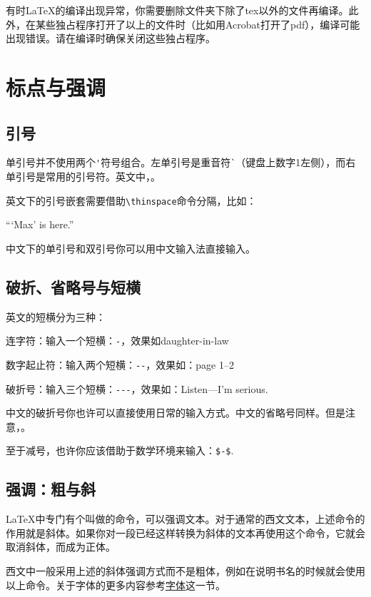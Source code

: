 {有时\LaTeX 的编译出现异常，你需要删除文件夹下除了tex以外的文件再编译。此外，在某些独占程序打开了以上的文件时（比如用Acrobat打开了pdf），编译可能出现错误。请在编译时确保关闭这些独占程序。

\section{标点与强调}
\subsection{引号}
单引号并不使用两个\verb|'|符号组合。左单引号是重音符\verb|`|（键盘上数字1左侧），而右单引号是常用的引号符。英文中，。

英文下的引号嵌套需要借助\verb|\thinspace|命令分隔，比如：

\begin{codeshow}
``\thinspace`Max' is here.''
\end{codeshow}

中文下的单引号和双引号你可以用中文输入法直接输入。

\subsection{破折、省略号与短横}
英文的短横分为三种：
\begin{feai}
\item 连字符：输入一个短横：\verb|-|，效果如daughter-in-law
\item 数字起止符：输入两个短横：\verb|--|，效果如：page 1--2
\item 破折号：输入三个短横：\verb|---|，效果如：Listen---I'm serious.
\end{feai}

中文的破折号你也许可以直接使用日常的输入方式。中文的省略号同样。但是注意，。

至于减号，也许你应该借助于数学环境来输入：\verb|$-$|. 

\subsection{强调：粗与斜}
\LaTeX 中专门有个叫做的命令，可以强调文本。对于通常的西文文本，上述命令的作用就是斜体。如果你对一段已经这样转换为斜体的文本再使用这个命令，它就会取消斜体，而成为正体。

西文中一般采用上述的斜体强调方式而不是粗体，例如在说明书名的时候就会使用以上命令。关于字体的更多内容参考\hyperref[sec:font]{字体}这一节。

}

